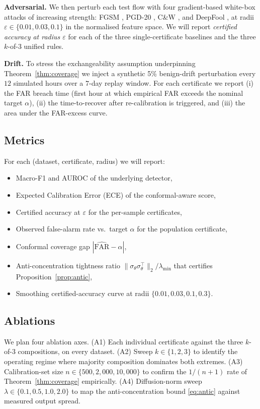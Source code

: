 \documentclass[journal,twoside]{IEEEtran}
\begin{document}
\textbf{Adversarial.} We then perturb each test flow with four
gradient-based white-box attacks of increasing strength: FGSM
\cite{goodfellow2015fgsm}, PGD-20 \cite{madry2018pgd}, C\&W
\cite{carlini2017cw}, and DeepFool \cite{moosavi2016deepfool}, at radii
$\varepsilon\in\{0.01, 0.03, 0.1\}$ in the normalised feature space.
We will report \emph{certified accuracy at radius $\varepsilon$} for
each of the three single-certificate baselines and the three $k$-of-$3$
unified rules.

\textbf{Drift.} To stress the exchangeability assumption underpinning
Theorem~\ref{thm:coverage} we inject a synthetic 5\% benign-drift
perturbation every $12$ simulated hours over a $7$-day replay window.
For each certificate we report (i) the FAR breach time (first hour at
which empirical FAR exceeds the nominal target $\alpha$), (ii) the
time-to-recover after re-calibration is triggered, and (iii) the area
under the FAR-excess curve.

\subsection{Metrics}
For each (dataset, certificate, radius) we will report:
\begin{itemize}[leftmargin=1.5em]
  \item Macro-F1 and AUROC of the underlying detector,
  \item Expected Calibration Error (ECE) of the conformal-aware score,
  \item Certified accuracy at $\varepsilon$ for the per-sample
        certificates,
  \item Observed false-alarm rate vs.\ target $\alpha$ for the
        population certificate,
  \item Conformal coverage gap $|\widehat{\mathrm{FAR}}-\alpha|$,
  \item Anti-concentration tightness ratio
        $\|\sigma_\theta\sigma_\theta^\top\|_2 / \lambda_{\min}$ that
        certifies Proposition~\ref{prop:antic},
  \item Smoothing certified-accuracy curve at radii
        $\{0.01,0.03,0.1,0.3\}$.
\end{itemize}

\subsection{Ablations}
We plan four ablation axes.
(A1) Each individual certificate against the three $k$-of-$3$
compositions, on every dataset.
(A2) Sweep $k\in\{1,2,3\}$ to identify the operating regime where
majority composition dominates both extremes.
(A3) Calibration-set size $n \in \{500, 2{,}000, 10{,}000\}$ to confirm
the $1/(n+1)$ rate of Theorem~\ref{thm:coverage} empirically.
(A4) Diffusion-norm sweep $\lambda \in \{0.1, 0.5, 1.0, 2.0\}$ to map
the anti-concentration bound \eqref{eq:antic} against measured output
spread.
\end{document}

